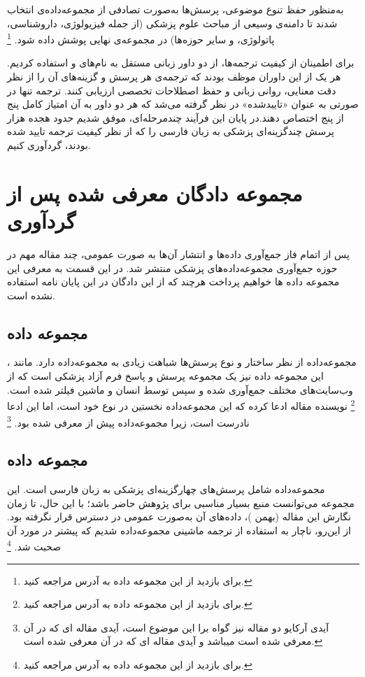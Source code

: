 به‌منظور حفظ تنوع موضوعی، پرسش‌ها به‌صورت تصادفی از مجموعه‌داده‌ی
انتخاب شدند تا دامنه‌ی وسیعی از مباحث علوم پزشکی (از جمله فیزیولوژی، داروشناسی، پاتولوژی، و سایر حوزه‌ها) در مجموعه‌ی نهایی پوشش داده شود.
\footnote{
	برای بازدید از این مجموعه داده به آدرس
	مراجعه کنید.
}

برای اطمینان از کیفیت ترجمه‌ها، از دو داور زبانی مستقل به نام‌های 
\cite{b65}
و 
\cite{b66}
استفاده کردیم. هر یک از این داوران موظف بودند که ترجمه‌ی هر پرسش و گزینه‌های آن را از نظر دقت معنایی، روانی زبانی و حفظ اصطلاحات تخصصی ارزیابی کنند. ترجمه تنها در صورتی به عنوان «تاییدشده» در نظر گرفته می‌شد که هر دو داور به آن امتیاز کامل پنج از پنج اختصاص دهند.در پایان این فرآیند چندمرحله‌ای، موفق شدیم حدود هجده هزار پرسش چندگزینه‌ای پزشکی به زبان فارسی را که از نظر کیفیت ترجمه تایید شده بودند، گردآوری کنیم.

\section{
مجموعه دادگان معرفی شده پس از گردآوری
}

پس از اتمام فاز جمع‌آوری داده‌ها و انتشار آن‌ها به صورت عمومی، چند مقاله مهم در حوزه جمع‌آوری مجموعه‌داده‌های پزشکی منتشر شد. در این قسمت به معرفی این مجموعه داده ها خواهیم پرداخت هرچند که از این دادگان در این پایان نامه استفاده نشده است.
\subsection{
مجموعه داده
}
مجموعه‌داده  \cite{b67} از نظر ساختار و نوع پرسش‌ها شباهت زیادی به مجموعه‌داده
دارد. مانند
، این مجموعه داده نیز یک مجموعه پرسش و پاسخ فرم آزاد پزشکی است که از وب‌سایت‌های مختلف جمع‌آوری شده و سپس توسط انسان و ماشین فیلتر شده است.
\footnote{
	برای بازدید از این مجموعه داده به آدرس
	مراجعه کنید.
}
نویسنده مقاله 
ادعا کرده که این مجموعه‌داده نخستین در نوع خود است، اما این ادعا نادرست است، زیرا مجموعه‌داده
پیش از 
معرفی شده بود.
\footnote{
آیدی آرکایو دو مقاله نیز گواه برا این موضوع است، آیدی مقاله ای که در آن
معرفی شده است
میباشد و آیدی مقاله ای که در آن
معرفی شده
است.
}

\subsection{
مجموعه داده
}
مجموعه‌داده 
\cite{b68}
شامل پرسش‌های چهارگزینه‌ای پزشکی به زبان فارسی است. این مجموعه می‌توانست منبع بسیار مناسبی برای پژوهش حاضر باشد؛ با این حال، تا زمان نگارش این مقاله (بهمن 
)، 
داده‌های آن به‌صورت عمومی در دسترس قرار نگرفته بود. از این‌رو، ناچار به استفاده از ترجمه ماشینی مجموعه‌داده
شدیم که پیشتر در مورد آن صحبت شد.
\footnote{
	برای بازدید از این مجموعه داده به آدرس
	مراجعه کنید.
}

